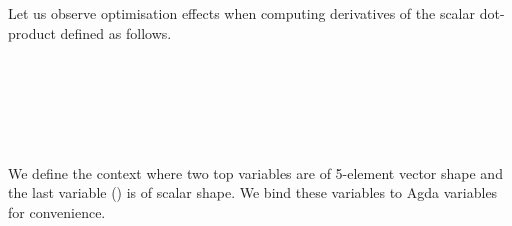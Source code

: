 Let us observe optimisation effects when computing derivatives of
the scalar dot-product defined as follows.
\begin{code}%
\>[2][@{}l@{\AgdaIndent{1}}]%
\>[4]\AgdaSpace{}%
\AgdaSymbol{:}\AgdaSpace{}%
\AgdaSpace{}%
\AgdaSpace{}%
\AgdaSymbol{(}\AgdaSpace{}%
\AgdaSymbol{)}\AgdaSpace{}%
\AgdaSpace{}%
\AgdaSpace{}%
\AgdaSpace{}%
\AgdaSymbol{(}\AgdaSpace{}%
\AgdaSymbol{)}\AgdaSpace{}%
\AgdaSpace{}%
\AgdaSpace{}%
\AgdaSpace{}%
\AgdaSymbol{(}\AgdaSpace{}%
\AgdaSymbol{)}\<%
\\
%
\>[4]\AgdaSpace{}%
\AgdaSpace{}%
\AgdaSpace{}%
\AgdaSymbol{=}\AgdaSpace{}%
\AgdaSpace{}%
\AgdaSpace{}%
\AgdaSpace{}%
\AgdaSpace{}%
\AgdaSpace{}%
\AgdaSymbol{(}\AgdaSpace{}%
\AgdaSymbol{)}\AgdaSpace{}%
\AgdaSpace{}%
\AgdaSpace{}%
\AgdaSpace{}%
\AgdaSymbol{(}\AgdaSpace{}%
\AgdaSymbol{)}\AgdaSpace{}%
\<%
\end{code}
\begin{code}[hide]%
%
\>[4]\AgdaSpace{}%
\AgdaSymbol{:}\AgdaSpace{}%
\<%
\\
%
\>[4]\AgdaSpace{}%
\AgdaSymbol{:}\AgdaSpace{}%
\AgdaSpace{}%
\AgdaSpace{}%
\AgdaSymbol{\AgdaUnderscore{}}\<%
\\
%
\>[4]\AgdaSpace{}%
\AgdaSymbol{:}\AgdaSpace{}%
\AgdaSpace{}%
\AgdaSpace{}%
\AgdaSymbol{\AgdaUnderscore{}}\<%
\\
%
\>[4]\AgdaSpace{}%
\AgdaSymbol{:}\AgdaSpace{}%
\AgdaSpace{}%
\AgdaSpace{}%
\AgdaSymbol{\AgdaUnderscore{}}\<%
\end{code}
We define the context  where two top variables are of 5-element vector shape
and the last variable () is of scalar shape.  We bind these variables to Agda
variables for convenience.
